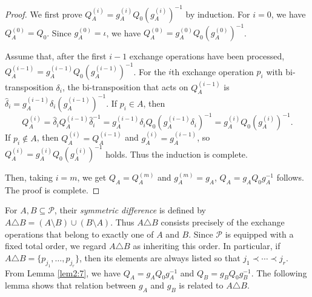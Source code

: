 \documentclass[12pt]{article}
\theoremstyle{definition}
\begin{document}
\begin{proof} We first prove  $Q_A^{(i)}=g_A^{(i)}Q_0(g_A^{(i)})^{-1}$ by induction. For $i=0$, we have $Q_A^{(0)}=Q_0$. Since $g_A^{(0)}=\iota$, we have $Q_A^{(0)}=g_A^{(0)}Q_0(g_A^{(0)})^{-1}$.

Assume that, after the first $i-1$ exchange operations have been processed, $Q_A^{(i-1)}=g_A^{(i-1)}Q_0(g_A^{(i-1)})^{-1}$.   For the $i$th exchange operation $p_i$ with  bi-transposition $\delta_i$, the bi-transposition that acts on
$Q_A^{(i-1)}$ is $\widehat\delta_i=g_A^{(i-1)}\delta_i(g_A^{(i-1)})^{-1}$. If $p_i\in A$, then $$Q_A^{(i)} =\widehat\delta_iQ_A^{(i-1)}\widehat\delta_i^{-1} =g_A^{(i-1)}\delta_iQ_0 (g_A^{(i-1)}\delta_i)^{-1} =g_A^{(i)}Q_0(g_A^{(i)})^{-1}.$$ If $p_i\notin A$, then $Q_A^{(i)}=Q_A^{(i-1)}$ and $g_A^{(i)}=g_A^{(i-1)}$, so $Q_A^{(i)}=g_A^{(i)}Q_0(g_A^{(i)})^{-1}$ holds. Thus the induction is complete.

Then, taking $i=m$, we get $Q_A=Q_A^{(m)}$ and $g_A^{(m)}=g_A$, $Q_A=g_AQ_0g_A^{-1}$ follows. The proof is complete.
 \end{proof}


For $A,B\subseteq\mathcal P$, their \emph{symmetric difference} is defined by
$A\triangle B=(A\setminus B)\cup(B\setminus A)$. Thus
$A\triangle B$ consists precisely of the exchange operations that belong
to exactly one of $A$ and $B$. Since $\mathcal P$ is equipped with a
fixed total order, we regard $A\triangle B$ as inheriting this order.
In particular, if
$A\triangle B=\{p_{j_1},\ldots,p_{j_r}\}$, then its elements are always
listed so that $j_1\prec\cdots\prec j_r$.
From Lemma \ref{lem2:7}, we have $Q_A=g_AQ_0g_A^{-1}$ and $Q_B=g_BQ_0g_B^{-1}$. The following lemma shows that relation between $g_A$ and $g_B$ is related to $A\triangle B$.
\end{document}
